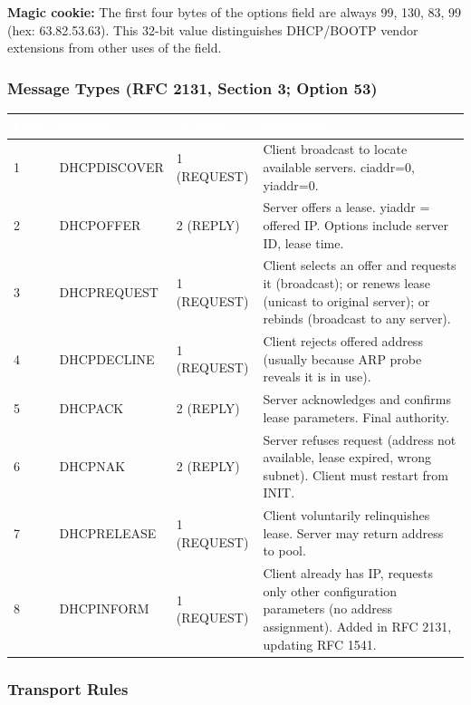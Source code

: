 \documentclass[11pt,letterpaper]{article}
\newcommand{\tableheader}[1]{\textbf{\sffamily\textcolor{white}{#1}}}
\begin{document}
\textbf{Magic cookie:} The first four bytes of the options field are always 99, 130, 83, 99 (hex: 63.82.53.63). This 32-bit value distinguishes DHCP/BOOTP vendor extensions from other uses of the field.

\subsubsection{Message Types (RFC 2131, Section 3; Option 53)}

\begin{center}
\begin{tabularx}{\textwidth}{C{1cm}L{2.5cm}C{1.5cm}X}
\toprule
{}
\tableheader{Code} & \tableheader{Message} & \tableheader{op field} & \tableheader{Semantics} \\
 & DHCPDISCOVER & 1 (REQUEST) & Client broadcast to locate available servers. ciaddr=0, yiaddr=0. \\
2 & DHCPOFFER & 2 (REPLY) & Server offers a lease. yiaddr = offered IP. Options include server ID, lease time. \\
3 & DHCPREQUEST & 1 (REQUEST) & Client selects an offer and requests it (broadcast); or renews lease (unicast to original server); or rebinds (broadcast to any server). \\
4 & DHCPDECLINE & 1 (REQUEST) & Client rejects offered address (usually because ARP probe reveals it is in use). \\
5 & DHCPACK & 2 (REPLY) & Server acknowledges and confirms lease parameters. Final authority. \\
6 & DHCPNAK & 2 (REPLY) & Server refuses request (address not available, lease expired, wrong subnet). Client must restart from INIT. \\
7 & DHCPRELEASE & 1 (REQUEST) & Client voluntarily relinquishes lease. Server may return address to pool. \\
8 & DHCPINFORM & 1 (REQUEST) & Client already has IP, requests only other configuration parameters (no address assignment). Added in RFC 2131, updating RFC 1541. \\
\bottomrule
\end{tabularx}
\end{center}

\subsubsection{Transport Rules}
\end{document}
